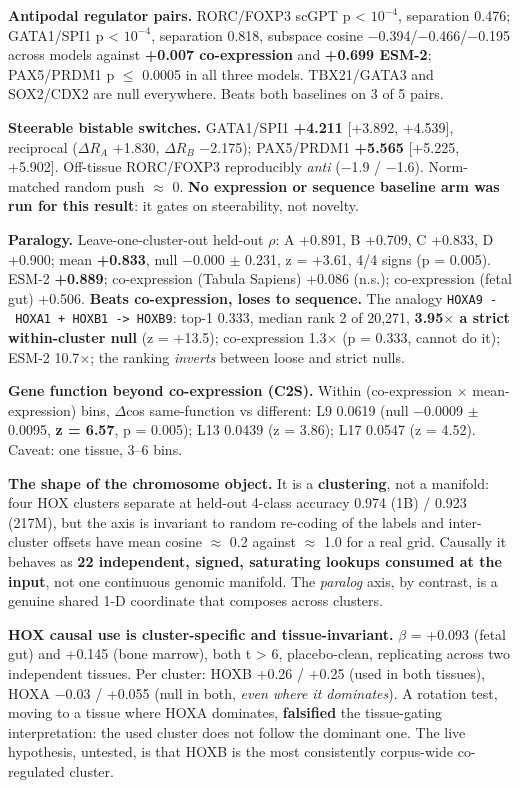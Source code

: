 \textbf{Antipodal regulator pairs.} RORC/FOXP3 scGPT p \textless{} \(10^{-4}\), separation 0.476; GATA1/SPI1 p \textless{} \(10^{-4}\),
separation 0.818, subspace cosine \(-\)0.394/\(-\)0.466/\(-\)0.195 across models against \textbf{+0.007 co-expression}
and \textbf{+0.699 ESM-2}; PAX5/PRDM1 p \(\le\) 0.0005 in all three models. TBX21/GATA3 and SOX2/CDX2 are null
everywhere. Beats both baselines on 3 of 5 pairs.

\textbf{Steerable bistable switches.} GATA1/SPI1 \textbf{+4.211} {[}+3.892, +4.539{]}, reciprocal (\(\Delta R_A\) +1.830,
\(\Delta R_B\) \(-\)2.175); PAX5/PRDM1 \textbf{+5.565} {[}+5.225, +5.902{]}. Off-tissue RORC/FOXP3 reproducibly \emph{anti}
(\(-\)1.9 / \(-\)1.6). Norm-matched random push \(\approx\) 0. \textbf{No expression or sequence baseline arm was run for this
result}: it gates on steerability, not novelty.

\textbf{Paralogy.} Leave-one-cluster-out held-out \(\rho\): A +0.891, B +0.709, C +0.833, D +0.900; mean \textbf{+0.833},
null \(-\)0.000 \(\pm\) 0.231, z = +3.61, 4/4 signs (p = 0.005). ESM-2 \textbf{+0.889}; co-expression (Tabula Sapiens)
+0.086 (n.s.); co-expression (fetal gut) +0.506. \textbf{Beats co-expression, loses to sequence.} The
analogy \texttt{HOXA9\ -\ HOXA1\ +\ HOXB1\ -\textgreater{}\ HOXB9}: top-1 0.333, median rank 2 of 20,271, \textbf{3.95\(\times\) a strict
within-cluster null} (z = +13.5); co-expression 1.3\(\times\) (p = 0.333, cannot do it); ESM-2 10.7\(\times\); the
ranking \emph{inverts} between loose and strict nulls.

\textbf{Gene function beyond co-expression (C2S).} Within (co-expression \(\times\) mean-expression) bins, \(\Delta\)cos
same-function vs different: L9 0.0619 (null \(-\)0.0009 \(\pm\) 0.0095, \textbf{z = 6.57}, p = 0.005); L13 0.0439
(z = 3.86); L17 0.0547 (z = 4.52). Caveat: one tissue, 3--6 bins.

\textbf{The shape of the chromosome object.} It is a \textbf{clustering}, not a manifold: four HOX clusters
separate at held-out 4-class accuracy 0.974 (1B) / 0.923 (217M), but the axis is invariant to random
re-coding of the labels and inter-cluster offsets have mean cosine \(\approx\) 0.2 against \(\approx\) 1.0 for a real grid.
Causally it behaves as \textbf{22 independent, signed, saturating lookups consumed at the input}, not one
continuous genomic manifold. The \emph{paralog} axis, by contrast, is a genuine shared 1-D coordinate that
composes across clusters.

\textbf{HOX causal use is cluster-specific and tissue-invariant.} \(\beta\) = +0.093 (fetal gut) and +0.145 (bone
marrow), both t \textgreater{} 6, placebo-clean, replicating across two independent tissues. Per cluster: HOXB
+0.26 / +0.25 (used in both tissues), HOXA \(-\)0.03 / +0.055 (null in both, \emph{even where it dominates}).
A rotation test, moving to a tissue where HOXA dominates, \textbf{falsified} the tissue-gating
interpretation: the used cluster does not follow the dominant one. The live hypothesis, untested, is
that HOXB is the most consistently corpus-wide co-regulated cluster.

